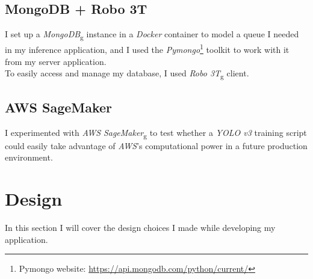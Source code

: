 \subsection*{MongoDB + Robo 3T}
I set up a \emph{\gls{MongoDB}}\textsubscript{g} instance in a \emph{Docker} container to model a queue I needed in my inference application, and I used the \emph{Pymongo}\footnote{Pymongo website: \url{https://api.mongodb.com/python/current/}} toolkit to work with it from my server application. \\
To easily access and manage my database, I used \emph{\gls{Robo 3T}}\textsubscript{g} client.

\subsection*{AWS SageMaker}
I experimented with \emph{AWS} \emph{\gls{SageMaker}}\textsubscript{g} to test whether a \emph{YOLO v3} training script could easily take advantage of \emph{AWS}'s computational power in a future production environment.






\section{Design}
\label{sec:design}
In this section I will cover the design choices I made while developing my application.

